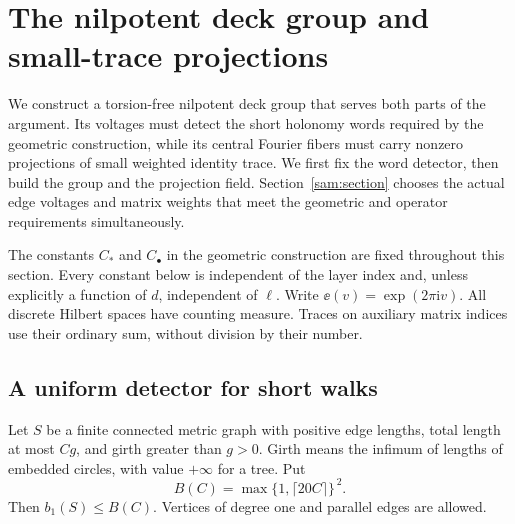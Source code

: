 \section{The nilpotent deck group and small-trace projections}\label{nil:section}

We construct a torsion-free nilpotent deck group that serves both parts
of the argument. Its voltages must detect the short holonomy words
required by the geometric construction, while its central Fourier fibers
must carry nonzero projections of small weighted identity trace. We first
fix the word detector, then build the group and the projection field.
Section~\ref{sam:section} chooses the actual edge voltages and matrix
weights that meet the geometric and operator requirements simultaneously.

The constants \(C_*\) and \(C_\bullet\) in the geometric construction are
fixed throughout this section. Every constant below is independent of the
layer index and, unless explicitly a function of \(d\), independent of
\(\ell\). Write \(\ee(v)=\exp(2\pi\mathrm i v)\).
All discrete Hilbert spaces have counting measure. Traces on auxiliary
matrix indices use their ordinary sum, without division by their number.

\subsection{A uniform detector for short walks}

\begin{lemma}\label{nil:rank}
Let \(S\) be a finite connected metric graph with positive edge lengths,
total length at most \(Cg\), and girth greater than \(g>0\).
Girth means the infimum of lengths of embedded circles, with value
\(+\infty\) for a tree. Put
\[
 B(C)=\max\{1,\lceil20C\rceil\}^{\,2}.
\]
Then \(b_1(S)\le B(C)\). Vertices of degree one and parallel edges are
allowed.
\end{lemma}

